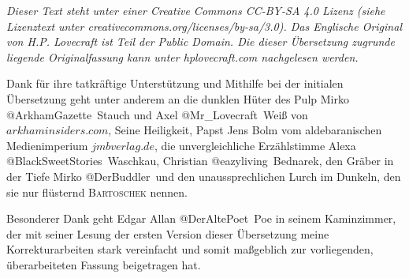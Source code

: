 \maketitle

\textit{Dieser Text steht unter einer Creative Commons CC-BY-SA 4.0 Lizenz
(siehe Lizenztext unter creativecommons.org/licenses/by-sa/3.0). Das Englische Original von H.P. Lovecraft ist Teil der Public Domain. Die dieser Übersetzung zugrunde liegende Originalfassung kann unter hplovecraft.com nachgelesen werden.}

\vspace{18pt}

Dank für ihre tatkräftige Unterstützung und Mithilfe bei der initialen Übersetzung geht unter anderem an die dunklen Hüter des Pulp Mirko \mbox{\glqq @ArkhamGazette\grqq}\ Stauch und Axel \glqq @Mr\_Lovecraft\grqq\ Weiß von $arkhaminsiders.com$, Seine Heiligkeit, Papst Jens Bolm vom aldebaranischen Medienimperium $jmbverlag.de$, die unvergleichliche Erzählstimme Alexa \mbox{\glqq @BlackSweetStories\grqq}\ Waschkau, Christian \glqq @eazyliving\grqq\ Bednarek, den Gräber in der Tiefe Mirko \mbox{\glqq @DerBuddler\grqq}\ und den unaussprechlichen Lurch im Dunkeln, den sie nur flüsternd \textsc{Bartoschek} nennen.

\vspace{12pt}

Besonderer Dank geht Edgar Allan \mbox{\glqq @DerAltePoet\grqq}\ Poe in seinem Kaminzimmer, der mit seiner Lesung der ersten Version dieser Übersetzung meine Korrekturarbeiten stark vereinfacht und somit maßgeblich zur vorliegenden, überarbeiteten Fassung beigetragen hat.